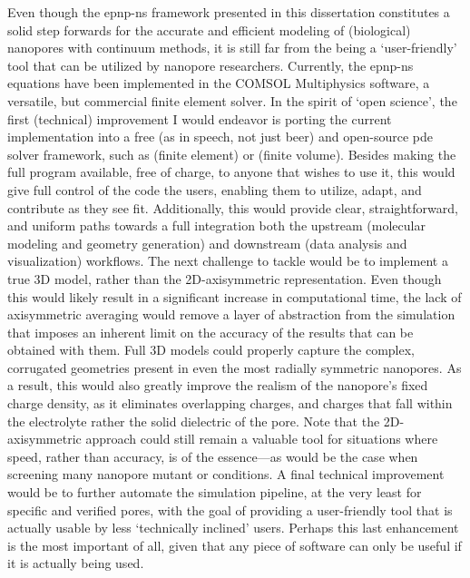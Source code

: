 Even though the \gls{epnp-ns} framework presented in this dissertation constitutes a solid step forwards for
the accurate and efficient modeling of (biological) nanopores with continuum methods, it is still far from the
being a `user-friendly' tool that can be utilized by nanopore researchers. Currently, the \gls{epnp-ns}
equations have been implemented in the COMSOL Multiphysics software, a versatile, but commercial finite
element solver. In the spirit of `open science', the first (technical) improvement I would endeavor is porting
the current implementation into a free (as in speech, not just beer) and open-source \gls{pde} solver
framework, such as  (finite element) or  (finite volume). Besides making the full
program available, free of charge, to anyone that wishes to use it, this would give full control of the code
the users, enabling them to utilize, adapt, and contribute as they see fit. Additionally, this would provide
clear, straightforward, and uniform paths towards a full integration both the upstream (molecular modeling and
geometry generation) and downstream (data analysis and visualization) workflows. The next challenge to tackle
would be to implement a true 3D model, rather than the 2D-axisymmetric representation. Even though this would
likely result in a significant increase in computational time, the lack of axisymmetric averaging would remove
a layer of abstraction from the simulation that imposes an inherent limit on the accuracy of the results that
can be obtained with them. Full 3D models could properly capture the complex, corrugated geometries present in
even the most radially symmetric nanopores. As a result, this would also greatly improve the realism of the
nanopore's fixed charge density, as it eliminates overlapping charges, and charges that fall within the
electrolyte rather the solid dielectric of the pore. Note that the 2D-axisymmetric approach could still remain
a valuable tool for situations where speed, rather than accuracy, is of the essence---as would be the case
when screening many nanopore mutant or conditions. A final technical improvement would be to further automate
the simulation pipeline, at the very least for specific and verified pores, with the goal of providing a
user-friendly tool that is actually usable by less `technically inclined' users.\footnotemark%
%
%
Perhaps this last enhancement is the most important of all, given that any piece of software can only be
useful if it is actually being used.


